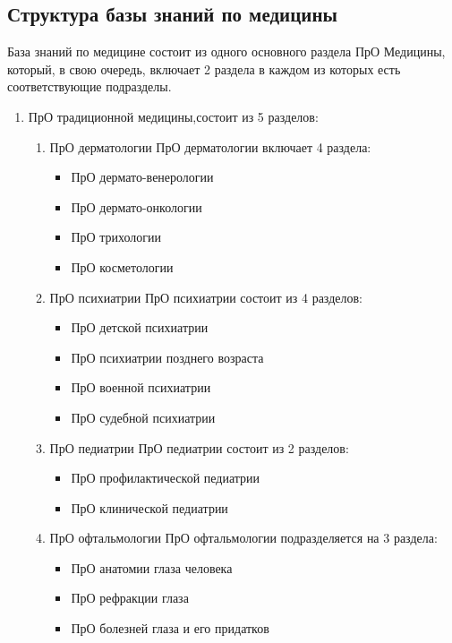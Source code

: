 \subsection{Структура базы знаний по медицины}
База знаний по медицине состоит из одного основного раздела ПрО Медицины, который, в свою очередь, включает 2 раздела в каждом из которых есть соответствующие подразделы. 
\begin{enumerate}
	\item ПрО традиционной медицины,состоит из 5 разделов:
	\begin{enumerate}
		\item ПрО дерматологии
		ПрО дерматологии включает 4 раздела:	
		\begin{itemize}
			\item ПрО дермато-венерологии
			\item ПрО дермато-онкологии
			\item ПрО трихологии 
			\item ПрО косметологии\\
		\end{itemize}	
		\item ПрО психиатрии
		ПрО психиатрии состоит из 4 разделов:	
		\begin{itemize}
			\item ПрО детской психиатрии
			\item ПрО психиатрии позднего возраста
			\item ПрО военной психиатрии 
			\item ПрО судебной психиатрии\\
		\end{itemize}	
		\item ПрО педиатрии
		ПрО педиатрии состоит из 2 разделов:	
		\begin{itemize}
			\item ПрО профилактической педиатрии
			\item ПрО клинической педиатрии\\
		\end{itemize}	
		\item ПрО офтальмологии
		ПрО офтальмологии подразделяется на 3 раздела:	
		\begin{itemize}
			\item ПрО анатомии глаза человека
			\item ПрО рефракции глаза
			\item ПрО болезней глаза и его придатков\\
		\end{itemize}	

\end{enumerate}
\end{enumerate}
